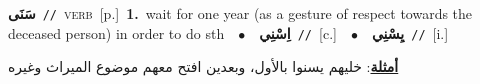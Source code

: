 \documentclass[10pt,a4paper,twoside]{article} %
\begin{document}
\begin{multicols}{2}
{\setlength\topsep{0pt}\textbf{\foreignlanguage{arabic}{سَنَى}}\ {\color{gray}\texttt{//}\color{black}}\ \textsc{verb}\ [p.]\ \textbf{1.}~wait for one year (as a gesture of respect towards the deceased person) in order to do sth\ \ $\bullet$\ \ \setlength\topsep{0pt}\textbf{\foreignlanguage{arabic}{اِسْنِي}}\ {\color{gray}\texttt{//}\color{black}}\ [c.]\ \ $\bullet$\ \ \setlength\topsep{0pt}\textbf{\foreignlanguage{arabic}{يِسْنِي}}\ {\color{gray}\texttt{//}\color{black}}\ [i.]\  \begin{flushright}\color{gray}\foreignlanguage{arabic}{\textbf{\underline{\foreignlanguage{arabic}{أمثلة}}}: خليهم يسنوا بالأول، وبعدين افتح معهم موضوع الميراث وغيره}\end{flushright}\color{black}} \vspace{2mm}


\end{multicols}
\end{document}
